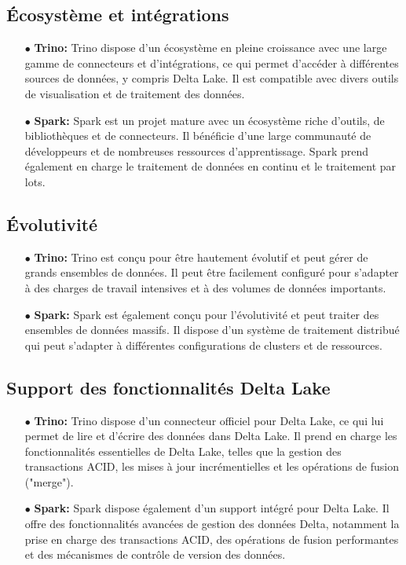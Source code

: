 \subsection{Écosystème et intégrations}
\begin{enumerate}
    \item[$\bullet$] \textbf{Trino:} Trino dispose d'un écosystème en pleine croissance avec une large gamme de connecteurs et d'intégrations, ce qui permet d'accéder à différentes sources de données, y compris Delta Lake. Il est compatible avec divers outils de visualisation et de traitement des données.
    \item[$\bullet$] \textbf{Spark:} Spark est un projet mature avec un écosystème riche d'outils, de bibliothèques et de connecteurs. Il bénéficie d'une large communauté de développeurs et de nombreuses ressources d'apprentissage. Spark prend également en charge le traitement de données en continu et le traitement par lots.
\end{enumerate}

\subsection{Évolutivité}
\begin{enumerate}
    \item[$\bullet$] \textbf{Trino:} Trino est conçu pour être hautement évolutif et peut gérer de grands ensembles de données. Il peut être facilement configuré pour s'adapter à des charges de travail intensives et à des volumes de données importants.
    \item[$\bullet$] \textbf{Spark:} Spark est également conçu pour l'évolutivité et peut traiter des ensembles de données massifs. Il dispose d'un système de traitement distribué qui peut s'adapter à différentes configurations de clusters et de ressources.
\end{enumerate}

\subsection{Support des fonctionnalités Delta Lake}
\begin{enumerate}
    \item[$\bullet$] \textbf{Trino:} Trino dispose d'un connecteur officiel pour Delta Lake, ce qui lui permet de lire et d'écrire des données dans Delta Lake. Il prend en charge les fonctionnalités essentielles de Delta Lake, telles que la gestion des transactions ACID, les mises à jour incrémentielles et les opérations de fusion ("merge").
    \item[$\bullet$] \textbf{Spark:} Spark dispose également d'un support intégré pour Delta Lake. Il offre des fonctionnalités avancées de gestion des données Delta, notamment la prise en charge des transactions ACID, des opérations de fusion performantes et des mécanismes de contrôle de version des données.
\end{enumerate}

